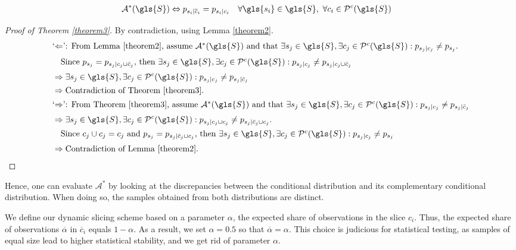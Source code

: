 \begin{theorem} \label{theorem3}
	\begin{align}
	\mathcal{A}^*(\gls{S}) \Leftrightarrow p_{s_i | {\overline{c}_i}} &= p_{s_i | {c_i}}
	\quad \forall \gls{s_i} \in \gls{S},~\forall c_i \in \mathcal{P}^{c}(\gls{S}) 
	\end{align}
\end{theorem}
\begin{proof}[Proof of Theorem \ref{theorem3}]
	By contradiction, using Lemma \ref{theorem2}.
	\begin{align*}
	\intertext{`$\Leftarrow$': From  Lemma \ref{theorem2}, assume $\mathcal{A}^*(\gls{S})$ and that $\exists s_j \in \gls{S}, \exists c_j \in \mathcal{P}^c(\gls{S}) : p_{s_j | c_j} \neq p_{s_j} $.}
	\intertext{\quad Since $p_{s_j} = p_{s_j | c_j \cup \bar{c}_j}$, then $\exists s_j \in \gls{S}, \exists c_j \in \mathcal{P}^c(\gls{S}) : p_{s_j | c_j} \neq p_{s_j | c_j \cup \bar{c}_j}$}
	&\Rightarrow \exists s_j \in \gls{S}, \exists c_j \in \mathcal{P}^c(\gls{S}) : p_{s_j | c_j} \neq p_{s_j | \bar{c}_j} \\
	&\Rightarrow  \text{Contradiction of Theorem \ref{theorem3}.} \\
	\intertext{`$\Rightarrow$': From  Theorem \ref{theorem3}, assume $\mathcal{A}^*(\gls{S})$ and that $\exists s_j \in \gls{S}, \exists c_j \in \mathcal{P}^c(\gls{S}) : p_{s_j | c_j} \neq p_{s_j | \bar{c}_j}$} 
	&\Rightarrow \exists s_j \in \gls{S}, \exists c_j \in \mathcal{P}^c(\gls{S}) : p_{s_j | c_j \cup c_j} \neq p_{s_j | \bar{c}_j \cup c_j}. \\
	\intertext{\quad Since $c_j \cup c_j = c_j$ and $p_{s_j} = p_{s_j | \bar{c}_j \cup c_j}$, then $\exists s_j \in \gls{S}, \exists c_j \in \mathcal{P}^c(\gls{S}) : p_{s_j | c_j} \neq p_{s_j}$}
	&\Rightarrow \text{Contradiction of Lemma \ref{theorem2}.} \qedhere
	\end{align*}
\end{proof}

Hence, one can evaluate $\mathcal{A}^*$ by looking at the discrepancies between the conditional distribution and its complementary conditional distribution. 
When doing so, the samples obtained from both distributions are distinct. 

We define our dynamic slicing scheme based on a parameter $\alpha$, the expected share of observations in the slice $c_i$. Thus, the expected share of observations $\overline{\alpha}$ in $\overline{c}_i$ equals $1-\alpha$. 
As a result, we set $\alpha = 0.5$ so that $\overline{\alpha} = \alpha$. 
This choice is judicious for statistical testing, as samples of equal size lead to higher statistical stability, and we get rid of parameter 
$\alpha$. 

